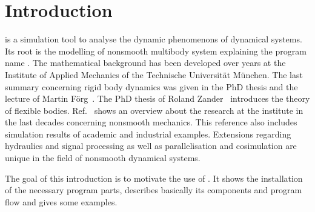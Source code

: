 \section{Introduction}
\MBSim{} is a simulation tool to analyse the dynamic phenomenons of dynamical systems. Its root is the modelling of nonsmooth multibody system explaining the program name \MBSim{}. The mathematical background has been developed over years at the Institute of Applied Mechanics of the Technische Universit\"at M\"unchen. The last summary concerning rigid body dynamics was given in the PhD thesis and the lecture of Martin F\"org~\cite{Foer09,Foer07}. The PhD thesis of Roland Zander~\cite{Zan09} introduces the theory of flexible bodies. Ref.~\cite{Zan08} shows an overview about the research at the institute in the last decades concerning nonsmooth mechanics. This reference also includes simulation results of academic and industrial examples. Extensions regarding hydraulics and signal processing as well as parallelisation and cosimulation are unique in the field of nonsmooth dynamical systems.\par
The goal of this introduction is to motivate the use of \MBSim{}. It shows the installation of the necessary program parts, describes basically its components and program flow and gives some examples. 

